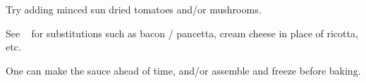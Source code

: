 \begin{variation}
\item Try adding minced sun dried tomatoes and/or mushrooms.

\item See ~\cite{newCookBook2014} for substitutions such as bacon / pancetta, cream cheese in place of ricotta, etc.

\item One can make the sauce ahead of time, and/or assemble and freeze before baking.
\end{variation}


\recipeend%
